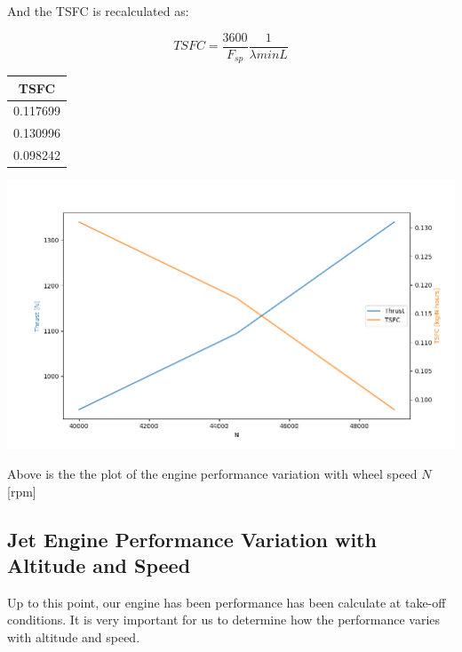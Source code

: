 \documentclass[titlepage]{article}
\begin{document}
And the TSFC is recalculated as:

\begin{equation}
  TSFC = \frac{3600}{F_{sp}} \frac{1}{\lambda minL}
\end{equation}

\begin{center}
  \begin{tabular}{|c|}
    \hline
    TSFC \\
    \hline
    0.117699 \\
    \hline
    0.130996 \\
    \hline
    0.098242 \\
    \hline
  \end{tabular}
\end{center}

\begin{center}
    \includegraphics[width=\textwidth]{fig_N.png}
\end{center}

Above is the the plot of the engine performance variation with wheel speed $N$ [rpm]

\subsection{Jet Engine Performance Variation with Altitude and Speed}

Up to this point, our engine has been performance has been calculate at take-off conditions. It is very important for us to determine how the 
performance varies with altitude and speed. 
\end{document}
